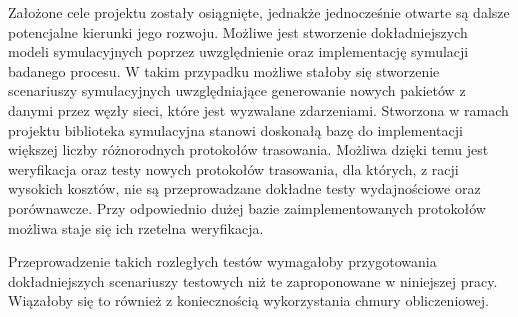 Założone cele projektu zostały osiągnięte, jednakże jednocześnie otwarte są dalsze potencjalne kierunki jego rozwoju. Możliwe jest stworzenie dokładniejszych modeli symulacyjnych poprzez uwzględnienie oraz implementację symulacji badanego procesu. W takim przypadku możliwe stałoby się stworzenie scenariuszy symulacyjnych uwzględniające generowanie nowych pakietów z danymi przez węzły sieci, które jest wyzwalane zdarzeniami.
Stworzona w ramach projektu biblioteka symulacyjna stanowi doskonałą bazę do implementacji większej liczby różnorodnych protokołów trasowania. Możliwa dzięki temu jest weryfikacja oraz testy nowych protokołów trasowania, dla których, z racji wysokich kosztów, nie są przeprowadzane dokładne testy wydajnościowe oraz porównawcze. Przy odpowiednio dużej bazie zaimplementowanych protokołów możliwa staje się ich rzetelna weryfikacja.

Przeprowadzenie takich rozległych testów wymagałoby przygotowania dokładniejszych scenariuszy testowych niż te zaproponowane w niniejszej pracy. Wiązałoby się to również z koniecznością wykorzystania chmury obliczeniowej.

